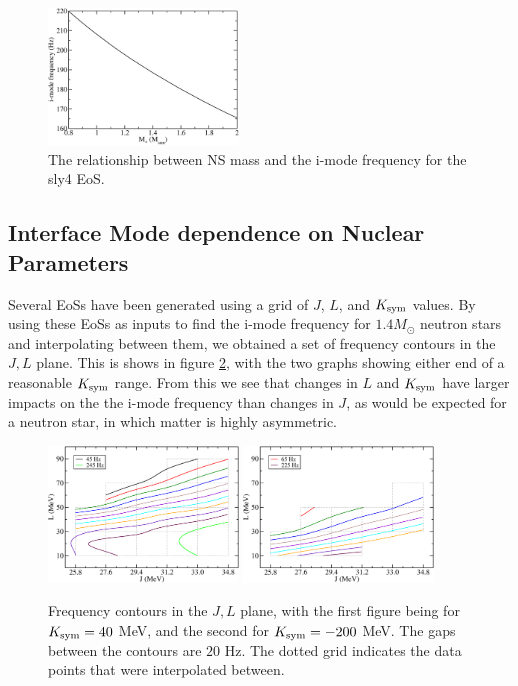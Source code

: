 \documentclass[fleqn,usenatbib]{mnras}
\begin{document}
\begin{figure}
\centering
\includegraphics[width=0.45\textwidth,angle=0]{M_vs_f}
\caption{The relationship between NS mass and the i-mode frequency for the sly4 EoS.}
\label{fig:M_vs_f}
\end{figure}






\subsection{Interface Mode dependence on Nuclear Parameters}
\hspace{\parindent}Several EoSs have been generated using a grid of $J$, $L$, and $K_{\rm sym}$ values. By using these EoSs as inputs to find the i-mode frequency for $1.4M_{\odot}$ neutron stars and interpolating between them, we obtained a set of frequency contours in the $J,L$ plane. This is shows in figure \ref{fig:freq_contours}, with the two graphs showing either end of a reasonable $K_{\rm sym}$ range. From this we see that changes in $L$ and $K_{\rm sym}$ have larger impacts on the the i-mode frequency than changes in $J$, as would be expected for a neutron star, in which matter is highly asymmetric.


\begin{figure}
\centering
\includegraphics[width=0.45\textwidth,angle=0]{contours_20gap_K40}
\includegraphics[width=0.45\textwidth,angle=0]{contours_20gap_Km200}
\caption{Frequency contours in the $J,L$ plane, with the first figure being for $K_{\rm sym}=40$ MeV, and the second for $K_{\rm sym}=-200$ MeV. The gaps between the contours are $20$ Hz. The dotted grid indicates the data points that were interpolated between.}
\label{fig:freq_contours}
\end{figure}
\end{document}
